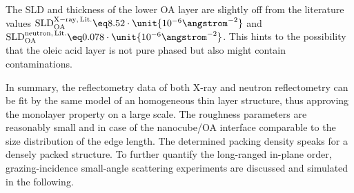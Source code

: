 \documentclass[\main/dresen_thesis.tex]{subfiles}
\begin{document}
  The SLD and thickness of the lower OA layer are slightly off from the literature values $\mathrm{SLD}_{\mathrm{OA}}^{\mathrm{X-ray, \,Lit.}} \eq 8.52 \cdot \unit{10^{-6} \angstrom^{-2}}$ and $\mathrm{SLD}_{\mathrm{OA}}^{\mathrm{neutron, \,Lit.}} \eq 0.078 \cdot \unit{10^{-6} \angstrom^{-2}}$.
  This hints to the possibility that the oleic acid layer is not pure phased but also might contain contaminations.

  In summary, the reflectometry data of both X-ray and neutron reflectometry can be fit by the same model of an homogeneous thin layer structure, thus approving the monolayer property on a large scale.
  The roughness parameters are reasonably small and in case of the nanocube/OA interface comparable to the size distribution of the edge length.
  The determined packing density speaks for a densely packed structure.
  To further quantify the long-ranged in-plane order, grazing-incidence small-angle scattering experiments are discussed and simulated in the following.
\end{document}
